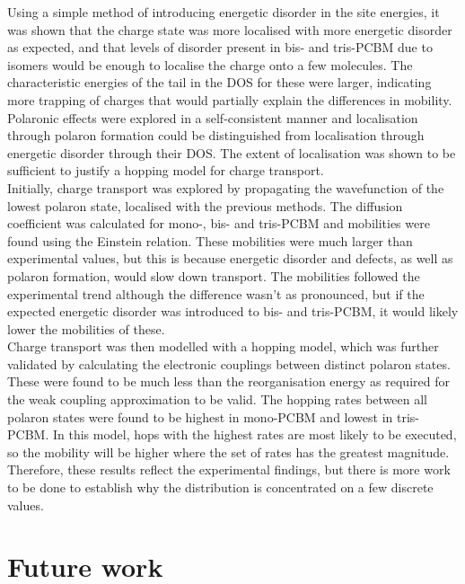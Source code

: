 \documentclass[a4paper,12pt]{article}
\begin{document}
\noindent Using a simple method of introducing energetic disorder in the site energies, it was shown that the charge state was more localised with more energetic disorder as expected, and that levels of disorder present in bis- and tris-PCBM due to isomers would be enough to localise the charge onto a few molecules. The characteristic energies of the tail in the DOS for these were larger, indicating more trapping of charges that would partially explain the differences in mobility. \\

\noindent Polaronic effects were explored in a self-consistent manner and localisation through polaron formation could be distinguished from localisation through energetic disorder through their DOS. The extent of localisation was shown to be sufficient to justify a hopping model for charge transport. \\
 
\noindent Initially, charge transport was explored by propagating the wavefunction of the lowest polaron state, localised with the previous methods. The diffusion coefficient was calculated for mono-, bis- and tris-PCBM and mobilities were found using the Einstein relation. These mobilities were much larger than experimental values, but this is because energetic disorder and defects, as well as polaron formation, would slow down transport. The mobilities followed the experimental trend although the difference wasn't as pronounced, but if the expected energetic disorder was introduced to bis- and tris-PCBM, it would likely lower the mobilities of these.\\

\noindent Charge transport was then modelled with a hopping model, which was further validated by calculating the electronic couplings between distinct polaron states. These were found to be much less than the reorganisation energy as required for the weak coupling approximation to be valid. The hopping rates between all polaron states were found to be highest in mono-PCBM and lowest in tris-PCBM. In this model, hops with the highest rates are most likely to be executed, so the mobility will be higher where the set of rates has the greatest magnitude. Therefore, these results reflect the experimental findings, but there is more work to be done to establish why the distribution is concentrated on a few discrete values.  

\section{Future work}
\end{document}
